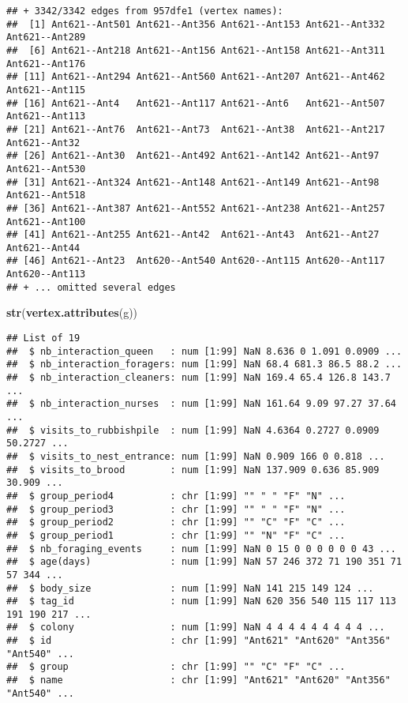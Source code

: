\documentclass[
]{article}
\newenvironment{Shaded}{\begin{snugshade}}{\end{snugshade}}
\newcommand{\KeywordTok}[1]{\textcolor[rgb]{0.13,0.29,0.53}{\textbf{#1}}}
\newcommand{\NormalTok}[1]{#1}
\begin{document}
\begin{verbatim}
## + 3342/3342 edges from 957dfe1 (vertex names):
##  [1] Ant621--Ant501 Ant621--Ant356 Ant621--Ant153 Ant621--Ant332 Ant621--Ant289
##  [6] Ant621--Ant218 Ant621--Ant156 Ant621--Ant158 Ant621--Ant311 Ant621--Ant176
## [11] Ant621--Ant294 Ant621--Ant560 Ant621--Ant207 Ant621--Ant462 Ant621--Ant115
## [16] Ant621--Ant4   Ant621--Ant117 Ant621--Ant6   Ant621--Ant507 Ant621--Ant113
## [21] Ant621--Ant76  Ant621--Ant73  Ant621--Ant38  Ant621--Ant217 Ant621--Ant32 
## [26] Ant621--Ant30  Ant621--Ant492 Ant621--Ant142 Ant621--Ant97  Ant621--Ant530
## [31] Ant621--Ant324 Ant621--Ant148 Ant621--Ant149 Ant621--Ant98  Ant621--Ant518
## [36] Ant621--Ant387 Ant621--Ant552 Ant621--Ant238 Ant621--Ant257 Ant621--Ant100
## [41] Ant621--Ant255 Ant621--Ant42  Ant621--Ant43  Ant621--Ant27  Ant621--Ant44 
## [46] Ant621--Ant23  Ant620--Ant540 Ant620--Ant115 Ant620--Ant117 Ant620--Ant113
## + ... omitted several edges
\end{verbatim}

\begin{Shaded}
\begin{Highlighting}[]
\KeywordTok{str}\NormalTok{(}\KeywordTok{vertex.attributes}\NormalTok{(g))}
\end{Highlighting}
\end{Shaded}

\begin{verbatim}
## List of 19
##  $ nb_interaction_queen   : num [1:99] NaN 8.636 0 1.091 0.0909 ...
##  $ nb_interaction_foragers: num [1:99] NaN 68.4 681.3 86.5 88.2 ...
##  $ nb_interaction_cleaners: num [1:99] NaN 169.4 65.4 126.8 143.7 ...
##  $ nb_interaction_nurses  : num [1:99] NaN 161.64 9.09 97.27 37.64 ...
##  $ visits_to_rubbishpile  : num [1:99] NaN 4.6364 0.2727 0.0909 50.2727 ...
##  $ visits_to_nest_entrance: num [1:99] NaN 0.909 166 0 0.818 ...
##  $ visits_to_brood        : num [1:99] NaN 137.909 0.636 85.909 30.909 ...
##  $ group_period4          : chr [1:99] "" " " "F" "N" ...
##  $ group_period3          : chr [1:99] "" " " "F" "N" ...
##  $ group_period2          : chr [1:99] "" "C" "F" "C" ...
##  $ group_period1          : chr [1:99] "" "N" "F" "C" ...
##  $ nb_foraging_events     : num [1:99] NaN 0 15 0 0 0 0 0 0 43 ...
##  $ age(days)              : num [1:99] NaN 57 246 372 71 190 351 71 57 344 ...
##  $ body_size              : num [1:99] NaN 141 215 149 124 ...
##  $ tag_id                 : num [1:99] NaN 620 356 540 115 117 113 191 190 217 ...
##  $ colony                 : num [1:99] NaN 4 4 4 4 4 4 4 4 4 ...
##  $ id                     : chr [1:99] "Ant621" "Ant620" "Ant356" "Ant540" ...
##  $ group                  : chr [1:99] "" "C" "F" "C" ...
##  $ name                   : chr [1:99] "Ant621" "Ant620" "Ant356" "Ant540" ...
\end{verbatim}
\end{document}
